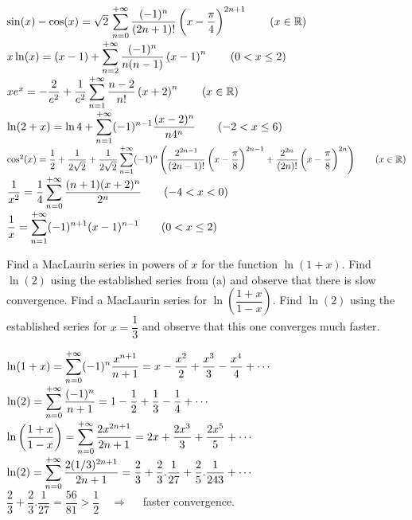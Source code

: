 \begin{Answer}

    \Question $\sin (x) - \cos (x) = \sqrt{2}\, \displaystyle\sum_{n=0}^{+\infty} \dfrac{(-1)^n}{(2n+1)!}\left(x - \dfrac{\pi}{4} \right)^{2n+1}     \qquad (x\in\mathbb{R})$
    \Question $x \ln (x) = (x-1) + \displaystyle\sum_{n=2}^{+\infty} \dfrac{(-1)^n}{n(n-1)}\left(x - 1\right)^n \qquad (0 < x \leq 2)$
    \Question $x e^x = -\dfrac{2}{e^2}+ \dfrac{1}{e^2}\displaystyle\sum_{n=1}^{+\infty} \dfrac{n-2}{n!} \left(x +2\right)^n \qquad (x\in\mathbb{R})$
    \Question $\ln(2+x) =  \ln 4 + \displaystyle\sum_{n=1}^{+\infty} (-1)^{n-1} \dfrac{(x-2)^{n}}{n 4^{n}} \qquad (-2 < x \leq 6)$
    \Question $\cos^2 (x) = \dfrac{1}{2} + \dfrac{1}{2\sqrt{2}} + \dfrac{1}{2\sqrt{2}}  \displaystyle\sum_{n=1}^{+\infty} (-1)^{n} \left( \dfrac{2^{2n-1}}{(2n-1)!}  \left(x - \dfrac{\pi}{8} \right)^{2n-1} + \dfrac{2^{2n}}{(2n)!}  \left(x - \dfrac{\pi}{8} \right)^{2n} \right)  \qquad (x\in\mathbb{R})$
    \Question $\dfrac{1}{x^2} = \dfrac{1}{4} \displaystyle\sum_{n=0}^{+\infty} \dfrac{(n+1)(x+2)^n}{2^n}\qquad (-4 < x < 0)$  
    \Question $ \dfrac{1}{x}= \displaystyle\sum_{n=1}^{+\infty}(-1)^{n+1} (x-1)^{n-1}\qquad (0 < x \leq 2)$ 
    
\end{Answer}

\pagebreak
\begin{Exercise}[difficulty = 3] 
    \Question  Find a MacLaurin series in powers of $x$ for the function $\ln(1+x)$. 
    \Question Find $\ln (2)$ using the established series from (a) and observe that there is slow convergence. 
    \Question Find a MacLaurin series for $\ln \left( \dfrac{1+x}{1-x} \right) $.
    \Question Find $\ln (2)$ using the established series for $ x = \dfrac{1}{3}$ and observe that this one converges much faster.
\end{Exercise}

\begin{Answer}

    \Question  $ \ln(1+x)  = \displaystyle\sum_{n=0}^{+\infty}(-1)^n \dfrac{x^{n+1}}{n+1} = x - \dfrac{x^2}{2} + \dfrac{x^3}{3} -\dfrac{x^4}{4} + \cdots $ \\[0.2cm]
   
    \Question $\ln (2) = \displaystyle\sum_{n=0}^{+\infty} \dfrac{(-1)^n}{n+1} = 1 - \dfrac{1}{2} + \dfrac{1}{3} -\dfrac{1}{4} + \cdots  $\\[0.2cm]
   
    \Question  $\ln \left( \dfrac{1+x}{1-x} \right)= \displaystyle\sum_{n=0}^{+\infty} \dfrac{2x^{2n+1}}{2n+1} = 2x + \dfrac{2x^3}{3} + \dfrac{2x^5}{5} + \cdots $\\[0.2cm]
   
    \Question  $\ln (2)  = \displaystyle\sum_{n=0}^{+\infty} \dfrac{2(1/3)^{2n+1}}{2n+1}=  \dfrac{2}{3} +  \dfrac{2}{3} . \dfrac{1}{27} +  \dfrac{2}{5}. \dfrac{1}{243} + \cdots $ \\[0.2cm]
    $\dfrac{2}{3} +  \dfrac{2}{3} . \dfrac{1}{27} = \dfrac{56}{81} > \dfrac{1}{2}   \quad \Rightarrow \quad $ faster convergence.
    
    
\end{Answer}

